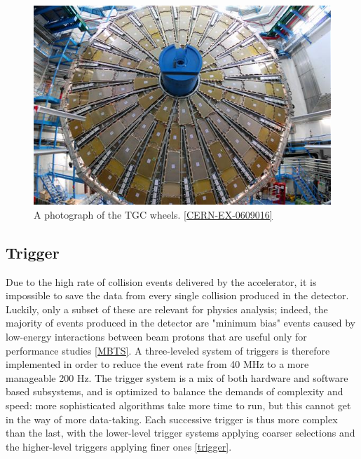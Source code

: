 \begin{figure}[ht!]
  \includegraphics[width=\linewidth]{figures/detector_chapter/TGCWheel.png}
  \caption{A photograph of the TGC wheels. \ref{CERN-EX-0609016}}
  \label{fig:TGCWheel}
\end{figure}

\subsection{Trigger} \label{sec:Trigger}
Due to the high rate of collision events delivered by the accelerator, it is impossible to save the data from every single collision produced in the detector. Luckily, only a subset of these are relevant for physics analysis; indeed, the majority of events produced in the detector are "minimum bias" events caused by low-energy interactions between beam protons that are useful only for performance studies \ref{MBTS}. A three-leveled system of triggers is therefore implemented in order to reduce the event rate from 40 MHz to a more manageable 200 Hz. The trigger system is a mix of both hardware and software based subsystems, and is optimized to balance the demands of complexity and speed: more sophisticated algorithms take more time to run, but this cannot get in the way of more data-taking. Each successive trigger is thus more complex than the last, with the lower-level trigger systems applying coarser selections and the higher-level triggers applying finer ones \ref{trigger}.

